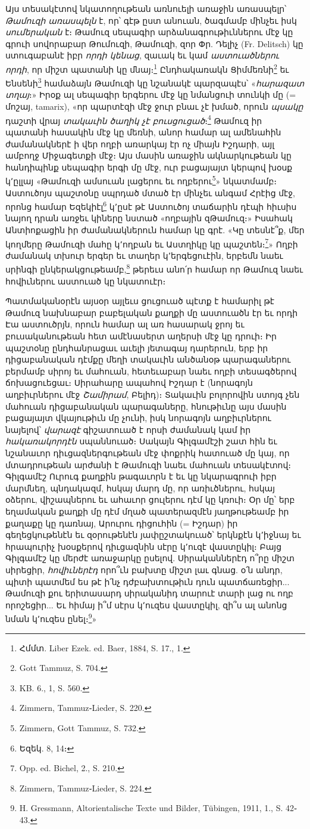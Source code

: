 \documentclass{article}
\begin{document}
{Այս տեսակէտով նկատողութեան առնուելի առաջին առասպելր՝ \emph{Թամուզի առասպելն} է, որ՝ գէթ ըստ անուան, ծագմամբ մինչեւ իսկ \emph{սումերական} է։ Թամուզ սեպագիր արձանագրութիւններու մէջ կը գրուի սովորաբար Թումուզի, Թամուզի, զոր Փր. Դելիչ (Fr. Delitsch) կը ստուգաբանէ իբր \emph{որդի կենաց}, զաւակ եւ կամ \emph{աստուածներու որդի}, որ միշտ պատանի կը մնայ։\footnote{Հմմտ. Liber Ezek. ed. Baer, 1884, S. 17., 1.} Ընդհակառակն Ցիմմեռնի\footnote{Gott Tammuz, S. 704.} եւ Ենսենի\footnote{KB. 6., 1, S. 560.} համաձայն Թամուզի կը նշանակէ պարզապէս՝ «\emph{հարազատ տղայ}։» Իրօք ալ սեպագիր երգերու մէջ կը նմանցուի տունկի մը (= մոշայ, tamarix), «որ պարտէզի մէջ ջուր բնաւ չէ խմած, որուն \emph{պսակը} դաշտի վրայ \emph{տակաւին ծաղիկ չէ բուսցուցած}։\footnote{Zimmern, Tammuz֊Lieder, S. 220.} Թամուզ իր պատանի հասակին մէջ կը մեռնի, անոր համար ալ ամենահին ժամանակներէ ի վեր ողբի առարկայ էր ոչ միայն Իշդարի, այլ ամբողջ Միջագետքի մէջ։ Այս մասին առաջին ակնարկութեան կը հանդիպինք սեպագիր երգի մը մէջ, ուր բացայայտ կերպով խօսք կ՚ըլլայ «Թամուզի ամսուան լացերու եւ ողբերու\footnote{Zimmern, Gott Tammuz, S. 732.}» նկատմամբ։ Աստուծոյս պաշտօնը սպրդած մտած էր մինչեւ անգամ Հրէից մէջ, որոնց համար Եզեկիէլ\footnote{Եզեկ. 8, 14։} կ՚ըսէ թէ Աստուծոյ տաճարին դէպի հիւսիս նայող դրան առջեւ կիները նստած «ողբային զԹամուզ։» Իսահակ Անտիոքացին իր ժամանակներուն համար կը գրէ. «Կը տեսնէ՞ք, մեր կողմերը Թամուզի մահը կ՚ողբան եւ Աստղիկը կը պաշտեն։\footnote{Opp. ed. Bichel, 2., S. 210.}» Ողբի ժամանակ տխուր երգեր եւ տաղեր կ՚երգեցուէին, երբեմն նաեւ սրինգի ընկերակցութեամբ,\footnote{Zimmern, Tammuz֊Lieder, S. 224.} թերեւս անո՛ր համար որ Թամուզ նաեւ հովիւներու աստուած կը նկատուէր։

Պատմականօրէն այսօր այլեւս ցուցուած պէտք է համարիլ թէ Թամուզ նախնաբար բաբելական քաղքի մը աստուածն էր եւ որդի Էա աստուծրյն, որուն համար ալ առ հասարակ ջրոյ եւ բուսականութեան հետ ամէնասերտ աղերսի մէջ կը դրուի։ Իր պաշտօնը ընդհանրացաւ աւելի յետագայ դարերուն, երբ իր դիցաբանական դէմքը մեղի տակաւին անծանօթ պարագաներու բերմամբ սիրոյ եւ մահուան, հետեւաբար նաեւ ողբի տեսագծերով ճոխացուեցաւ։ Սիրահարը ապահով Իշդար է (նորագոյն աղբիւրներու մէջ \emph{Շամիրամ}, Բելիդ)։ Տակաւին բոլորովին ստոյգ չեն մահուան դիցաբանական պարագաները, հնութիւնը այս մասին բացայայտ վկայութիւն մը չունի, իսկ նորագոյն աղբիւրներու նայելով՝ \emph{վարազէ} գիշատուած է որսի ժամանակ կամ իր \emph{հակառակորդէն} սպաննուած։ Սակայն Գիլգամէշի շատ հին եւ նշանաւոր դիւցազներգութեան մէջ փոքրիկ հատուած մը կայ, որ մտադրութեան արժանի է Թամուզի նաեւ մահուան տեսակէտով։ Գիլգամէշ Ուրուգ քաղքին թագաւորն է եւ կը նկարագրուի իբր մարմնեղ, պնդակազմ, հսկայ մարդ մը, որ առիւծներու, հսկայ օձերու, վիշապներու եւ ահաւոր ցուլերու դէմ կը կռուի։ Օր մը՝ երբ եղամական քաղքի մը դէմ մղած պատերազմէն յաղթութեամբ իր քաղաքը կը դառնայ, Արուրու դիցուհին (= Իշդար) իր գեղեցկութենէն եւ զօրութենէն յափըշտակուած՝ երկնքէն կ՚իջնայ եւ հրապուրիչ խօսքերով դիւցազնին սէրը կ՚ուզէ վաստըկիլ։ Բայց Գիլգամէշ կը մերժէ առաջարկը ըսելով. Սիրականներէդ ո՞րը միշտ սիրեցիր, \emph{հովիւներէդ} որո՞ւն բախտը միշտ լաւ գնաց. օ՛ն անդր, պիտի պատմեմ ես թէ ի՛նչ դժբախտութիւն դուն պատճառեցիր... Թամուզի քու երիտասարդ սիրականիդ տարուէ տարի լաց ու ողբ որոշեցիր... Եւ հիմայ ի՞մ սէրս կ՚ուզես վաստըկիլ, զի՞ս ալ անոնց նման կ՚ուզես ընել։\footnote{H. Gressmann, Altorientalische Texte und Bilder, Tübingen, 1911, 1., S. 42֊43.}»

}
\end{document}
